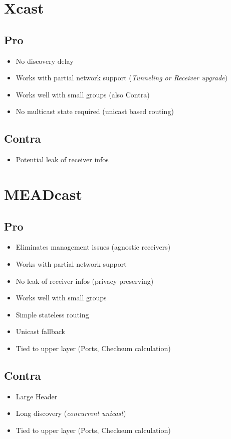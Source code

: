 \section*{Xcast}
\subsection*{Pro}
\begin{itemize}\itemsep0em
    \item No discovery delay
    \item Works with partial network support (\textit{Tunneling or Receiver upgrade})
    \item Works well with small groups (also Contra)
    \item No multicast state required (unicast based routing)
\end{itemize}

\subsection*{Contra}
\begin{itemize}\itemsep0em
    \item Potential leak of receiver infos
\end{itemize}


\section*{MEADcast}
\subsection*{Pro}
\begin{itemize}\itemsep0em
	\item Eliminates management issues (agnostic receivers)
	\item Works with partial network support
	\item No leak of receiver infos (privacy preserving)
	\item Works well with small groups
	\item Simple stateless routing
    \item Unicast fallback
    \item Tied to upper layer (Ports, Checksum calculation)
\end{itemize}

\subsection*{Contra}
\begin{itemize}\itemsep0em
	\item Large Header
    \item Long discovery (\textit{concurrent unicast})
    \item Tied to upper layer (Ports, Checksum calculation)
\end{itemize}
